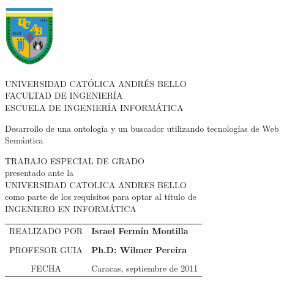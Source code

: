 \begin{center}
\parbox{4cm}{\includegraphics[width=0.16\textwidth]{images/escudoUcab.jpg}}\parbox{9cm}{\begin{center}
UNIVERSIDAD CATÓLICA ANDRÉS BELLO \\
FACULTAD DE INGENIERÍA \\
ESCUELA DE INGENIERÍA INFORMÁTICA \\
\end{center}}

\vspace{\fill}


\begin{LARGE}
Desarrollo de una ontología y un buscador utilizando tecnologías de Web Semántica
\end{LARGE}

\vspace{\fill}

TRABAJO ESPECIAL DE GRADO\\
presentado ante la\\
UNIVERSIDAD CATOLICA ANDRES BELLO\\
como parte de los requisitos para optar al t\'itulo de\\
INGENIERO EN INFORM\'ATICA

\vspace{\fill}

{
\begin{tabular}{cl}
REALIZADO POR & \textbf{Israel Fermín Montilla}\tabularnewline
\multicolumn{2}{c}{}\tabularnewline
PROFESOR GUIA & \textbf{Ph.D: Wilmer Pereira}\tabularnewline
\multicolumn{2}{c}{}\tabularnewline
FECHA & Caracas, septiembre de 2011\tabularnewline
\end{tabular}
}


\end{center}
